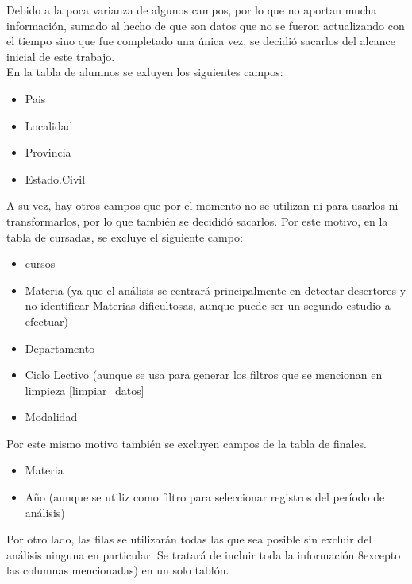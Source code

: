 
Debido a la poca varianza de algunos campos, por lo que no aportan mucha información, sumado al hecho de que son datos que no se fueron actualizando con el tiempo sino que fue completado una única vez, se decidió sacarlos del alcance inicial de este trabajo.\\

En la tabla de alumnos se exluyen los siguientes campos:
\begin{itemize}
\item Pais
\item Localidad
\item Provincia
\item Estado.Civil
\end{itemize}

A su vez, hay otros campos que por el momento no se utilizan ni para usarlos ni transformarlos, por lo que también se decididó sacarlos.
Por este motivo, en la tabla de cursadas, se excluye el siguiente campo:
\begin{itemize}
	\item cursos
	\item Materia (ya que el análisis se centrará principalmente en detectar desertores y no identificar Materias dificultosas, aunque puede ser un segundo estudio a efectuar) 
	\item Departamento
	\item Ciclo Lectivo (aunque se usa para generar los filtros que se mencionan en limpieza \ref{limpiar_datos}
	\item Modalidad
\end{itemize}

Por este mismo motivo también se excluyen campos de la tabla de finales.
\begin{itemize}
	\item Materia
	\item Año (aunque se utiliz como filtro para seleccionar registros del período de análisis)
\end{itemize}

Por otro lado, las filas se utilizarán todas las que sea posible sin excluir del análisis ninguna en particular. Se tratará de incluir toda la información 8excepto las columnas mencionadas) en un solo tablón.

